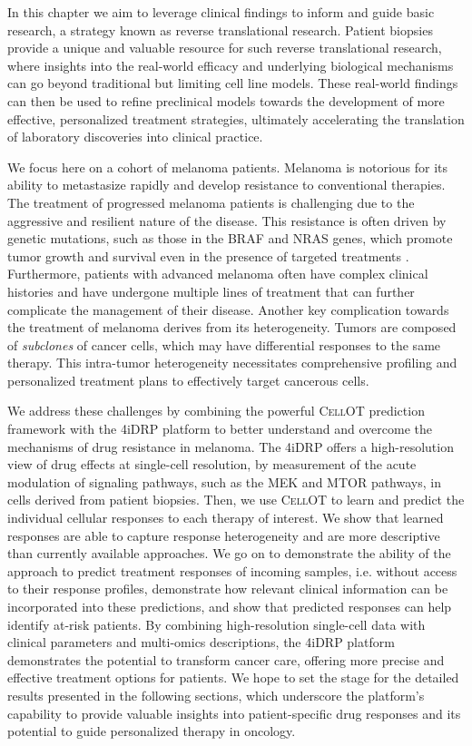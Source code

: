In this chapter
we aim to leverage clinical findings to inform and guide basic research, a strategy known as reverse translational research.
Patient biopsies provide a unique and valuable resource for such reverse translational research,
where insights into the real-world efficacy and underlying biological mechanisms can go beyond traditional but limiting cell line models.
These real-world findings can then be used to refine preclinical models towards the development of more effective, personalized treatment strategies, ultimately accelerating the translation of laboratory discoveries into clinical practice.

We focus here on a cohort of melanoma patients.
Melanoma is notorious for its ability to metastasize rapidly and develop resistance to conventional therapies.
The treatment of progressed melanoma patients is challenging due to the aggressive and resilient nature of the disease.
This resistance is often driven by genetic mutations, such as those in the BRAF and NRAS genes, which promote tumor growth and survival even in the presence of targeted treatments \cite{arozarena2019}.
Furthermore, patients with advanced melanoma often have complex clinical histories and have undergone multiple lines of treatment that can further complicate the management of their disease.
Another key complication towards the treatment of melanoma derives from its heterogeneity.
Tumors are composed of \emph{subclones} of cancer cells, which may have differential responses to the same therapy.
This intra-tumor heterogeneity necessitates comprehensive profiling and personalized treatment plans to effectively target cancerous cells.

We address these challenges by combining
the powerful \textsc{CellOT} prediction framework with the 4iDRP platform
to better understand and overcome the mechanisms of drug resistance in melanoma.
The 4iDRP offers a high-resolution view of drug effects at single-cell resolution, by measurement of the acute modulation of signaling pathways, such as the MEK and MTOR pathways, in cells derived from patient biopsies.
Then, we use \textsc{CellOT} to learn and predict the individual cellular responses to each therapy of interest.
We show that learned responses are able to capture response heterogeneity and are more descriptive than currently available approaches.
We go on to demonstrate the ability of the approach to predict treatment responses of incoming samples, i.e. without access to their response profiles,
demonstrate how relevant clinical information can be incorporated into these predictions,
and show that predicted responses can help identify at-risk patients.
By combining high-resolution single-cell data with clinical parameters and multi-omics descriptions, the 4iDRP platform demonstrates the potential to transform cancer care, offering more precise and effective treatment options for patients.
We hope to set the stage for the detailed results presented in the following sections, which underscore the platform's capability to provide valuable insights into patient-specific drug responses and its potential to guide personalized therapy in oncology.

